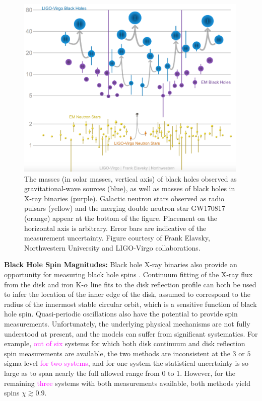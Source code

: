 \documentclass[iop,onecolumn]{revtex4}
\newcommand{\ilya}[1]{\textcolor{magenta}{#1}}
\begin{document}
\begin{figure}
	\centering
	\includegraphics[width=0.99\textwidth]{Graveyard.png}%
	\caption{\label{fig:BHmasses}  The masses (in solar masses, vertical axis) of black holes observed as gravitational-wave sources (blue), as well as masses of black holes in X-ray binaries (purple).  Galactic neutron stars observed as radio pulsars (yellow) and the merging double neutron star GW170817 (orange) appear at the bottom of the figure.  Placement on the horizontal axis is arbitrary.  Error bars are indicative of the measurement uncertainty.  Figure courtesy of Frank Elavsky, Northwestern University and LIGO-Virgo collaborations.}
\end{figure}


\textbf{Black Hole Spin Magnitudes:} Black hole X-ray binaries also provide an opportunity for measuring black hole spins \citep[see][for a recent review]{MillerMiller:2015}.  Continuum fitting of the X-ray flux from the disk and iron K-$\alpha$ line fits to the disk reflection profile can both be used to infer the location of the inner edge of the disk, assumed to correspond to the radius of the innermost stable circular orbit, which is a sensitive function of black hole spin.  Quasi-periodic oscillations also have the potential to provide spin measurements.  Unfortunately, the underlying physical mechanisms are not fully understood at present, and the models can suffer from significant systematics.  For example, \ilya{out of six} systems for which both disk continuum and disk reflection spin measurements are available, the two methods are inconsistent at the $3$ or $5$ sigma level \ilya{for two systems}, and for one system the statistical uncertainty is so large as to span nearly the full allowed range from $0$ to $1$.  However, for the remaining \ilya{three} systems with both measurements available, both methods yield spins $\chi \gtrsim 0.9$.  
\end{document}

